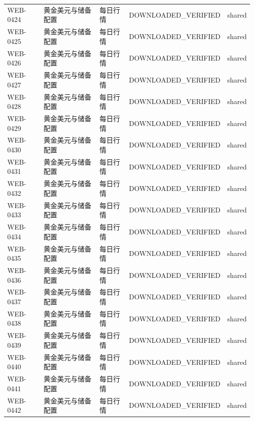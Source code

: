 \documentclass[UTF8,openany,oneside,11pt]{ctexbook}
\begin{document}
\begin{longtable}{L{1.4cm}L{2.4cm}L{6.0cm}L{3.0cm}L{1.8cm}}
WEB-\allowbreak{}0424 & 黄金美元与储备配置 & 每日行情 & DOWNLOADED\_\allowbreak{}VERIFIED & shared \\
WEB-\allowbreak{}0425 & 黄金美元与储备配置 & 每日行情 & DOWNLOADED\_\allowbreak{}VERIFIED & shared \\
WEB-\allowbreak{}0426 & 黄金美元与储备配置 & 每日行情 & DOWNLOADED\_\allowbreak{}VERIFIED & shared \\
WEB-\allowbreak{}0427 & 黄金美元与储备配置 & 每日行情 & DOWNLOADED\_\allowbreak{}VERIFIED & shared \\
WEB-\allowbreak{}0428 & 黄金美元与储备配置 & 每日行情 & DOWNLOADED\_\allowbreak{}VERIFIED & shared \\
WEB-\allowbreak{}0429 & 黄金美元与储备配置 & 每日行情 & DOWNLOADED\_\allowbreak{}VERIFIED & shared \\
WEB-\allowbreak{}0430 & 黄金美元与储备配置 & 每日行情 & DOWNLOADED\_\allowbreak{}VERIFIED & shared \\
WEB-\allowbreak{}0431 & 黄金美元与储备配置 & 每日行情 & DOWNLOADED\_\allowbreak{}VERIFIED & shared \\
WEB-\allowbreak{}0432 & 黄金美元与储备配置 & 每日行情 & DOWNLOADED\_\allowbreak{}VERIFIED & shared \\
WEB-\allowbreak{}0433 & 黄金美元与储备配置 & 每日行情 & DOWNLOADED\_\allowbreak{}VERIFIED & shared \\
WEB-\allowbreak{}0434 & 黄金美元与储备配置 & 每日行情 & DOWNLOADED\_\allowbreak{}VERIFIED & shared \\
WEB-\allowbreak{}0435 & 黄金美元与储备配置 & 每日行情 & DOWNLOADED\_\allowbreak{}VERIFIED & shared \\
WEB-\allowbreak{}0436 & 黄金美元与储备配置 & 每日行情 & DOWNLOADED\_\allowbreak{}VERIFIED & shared \\
WEB-\allowbreak{}0437 & 黄金美元与储备配置 & 每日行情 & DOWNLOADED\_\allowbreak{}VERIFIED & shared \\
WEB-\allowbreak{}0438 & 黄金美元与储备配置 & 每日行情 & DOWNLOADED\_\allowbreak{}VERIFIED & shared \\
WEB-\allowbreak{}0439 & 黄金美元与储备配置 & 每日行情 & DOWNLOADED\_\allowbreak{}VERIFIED & shared \\
WEB-\allowbreak{}0440 & 黄金美元与储备配置 & 每日行情 & DOWNLOADED\_\allowbreak{}VERIFIED & shared \\
WEB-\allowbreak{}0441 & 黄金美元与储备配置 & 每日行情 & DOWNLOADED\_\allowbreak{}VERIFIED & shared \\
WEB-\allowbreak{}0442 & 黄金美元与储备配置 & 每日行情 & DOWNLOADED\_\allowbreak{}VERIFIED & shared \\

\end{longtable}
\end{document}

